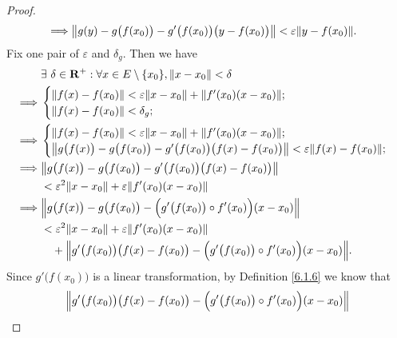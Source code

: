 \begin{proof}
\begin{align*}
        \implies & \norm*{g(y) - g\big(f(x_0)\big) - g'\big(f(x_0)\big)\big(y - f(x_0)\big)} < \varepsilon \norm*{y - f(x_0)}.
    \end{align*}
    Fix one pair of \(\varepsilon\) and \(\delta_g\).
    Then we have
    \begin{align*}
                 & \exists\ \delta \in \R^+ : \forall x \in E \setminus \{x_0\}, \norm*{x - x_0} < \delta                                       \\
        \implies & \begin{cases}
                       \norm*{f(x) - f(x_0)} < \varepsilon \norm*{x - x_0} + \norm*{f'(x_0)(x - x_0)}; \\
                       \norm*{f(x) - f(x_0)} < \delta_g;
                   \end{cases}                                              \\
        \implies & \begin{cases}
                       \norm*{f(x) - f(x_0)} < \varepsilon \norm*{x - x_0} + \norm*{f'(x_0)(x - x_0)}; \\
                       \norm*{g\big(f(x)\big) - g\big(f(x_0)\big) - g'\big(f(x_0)\big) \big(f(x) - f(x_0)\big)} < \varepsilon \norm*{f(x) - f(x_0)};
                   \end{cases} \\
        \implies & \norm*{g\big(f(x)\big) - g\big(f(x_0)\big) - g'\big(f(x_0)\big) \big(f(x) - f(x_0)\big)}                                     \\
                 & < \varepsilon^2 \norm*{x - x_0} + \varepsilon \norm*{f'(x_0)(x - x_0)}                                                       \\
        \implies & \norm*{g\big(f(x)\big) - g\big(f(x_0)\big) - \Big(g'\big(f(x_0)\big) \circ f'(x_0)\Big) (x - x_0)}                           \\
                 & < \varepsilon^2 \norm*{x - x_0} + \varepsilon \norm*{f'(x_0)(x - x_0)}                                                       \\
                 & \quad + \norm*{g'\big(f(x_0)\big) \big(f(x) - f(x_0)\big) - \Big(g'\big(f(x_0)\big) \circ f'(x_0)\Big) (x - x_0)}.
    \end{align*}
    Since \(g'\big(f(x_0)\big)\) is a linear transformation, by Definition \ref{6.1.6} we know that
    \begin{align*}
         & \norm*{g'\big(f(x_0)\big) \big(f(x) - f(x_0)\big) - \Big(g'\big(f(x_0)\big) \circ f'(x_0)\Big) (x - x_0)} \\

\end{align*}
\end{proof}
